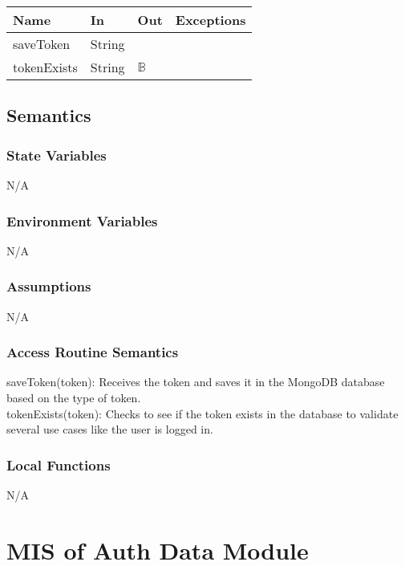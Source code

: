 \documentclass[12pt, titlepage]{article}
\begin{document}
	\begin{center}
		\begin{tabular}{l  l  l  l}
			\hline
			\textbf{Name} & \textbf{In} & \textbf{Out} & \textbf{Exceptions} \\
			\hline
			saveToken & String & ~ & ~ \\
			\hline
			tokenExists & String & $\mathbb{B}$ & ~ \\
			\hline
		\end{tabular}
	\end{center}
	
	\subsection{Semantics}
	
	\subsubsection{State Variables}
	N/A
	
	\subsubsection{Environment Variables}
	
	N/A
	
	\subsubsection{Assumptions}
	N/A
	
	\subsubsection{Access Routine Semantics}
	
	\noindent saveToken(token): Receives the token and saves it in the MongoDB database based on the type of token. \\
	
	\noindent tokenExists(token): Checks to see if the token exists in the database to validate several use cases like the user is logged in. \\
	
	\subsubsection{Local Functions}
	
	N/A
	
	\newpage
	
	
	\section{MIS of Auth Data Module} \label{Module} 
	
\end{document}
